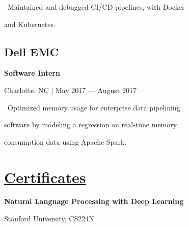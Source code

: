 \documentclass{article}
\begin{document}
\begin{minipage}[t]{0.45\textwidth\hspace{0in}}
\begin{minipage}[t]{3.75in\textwidth\hspace{0in}}
            \vspace{0.3em}
            \hspace{1em}\textasteriskcentered \, \mdseries\textrm{Maintained and debugged CI/CD pipelines, with Docker}

            \hspace{1.6em} and Kubernetes.
        \end{minipage}

        \vspace{0.3em}
        \subsection{Dell EMC}
        \vspace{-0.5em}\hspace{0.1em}
        \mdseries\bfseries{Software Intern}
        \vspace{0.1em}
        
        \hspace{0.5em}\mdseries\textrm{Charlotte, NC | May 2017 — August 2017}

        \vspace{-0.4em}
        \begin{minipage}[t]{3.75in\textwidth\hspace{0in}}
            \vspace{0.1em}
            \hspace{1em}\textasteriskcentered \, \mdseries\textrm{Optimized memory usage for enterprise data pipelining} 
            
            \hspace{1.6em} software by modeling a regression on real-time memory 
            
            \hspace{1.6em} consumption data using Apache Spark.
        \end{minipage}

        \section{\underline{Certificates}}
        \begin{minipage}[t]{3.75in\textwidth\hspace{0in}}            
            \mdseries\bfseries{Natural Language Processing with Deep Learning}
            
            \hspace{0.4em}\small\mdseries\textrm Stanford University, CS224N
            

\end{minipage}
\end{minipage}
\end{document}
